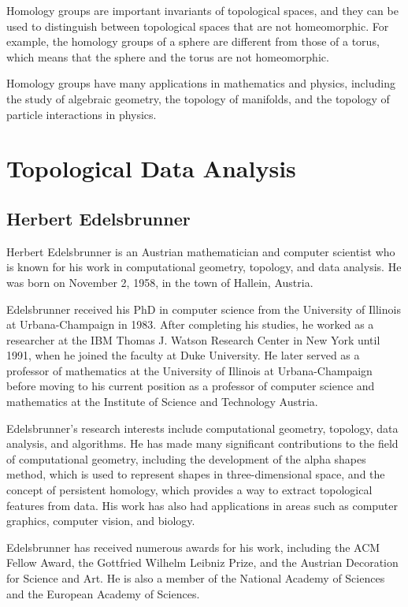 \documentclass{IEEEcsmag}
\begin{document}
        Homology groups are important invariants of topological spaces, and they can be used to distinguish 
        between topological spaces that are not homeomorphic. For example, the homology groups of a sphere are 
        different from those of a torus, which means that the sphere and the torus are not homeomorphic.

        Homology groups have many applications in mathematics and physics, including the study of algebraic 
        geometry, the topology of manifolds, and the topology of particle interactions in physics.

\section{Topological Data Analysis}
  \subsection{Herbert Edelsbrunner}
    Herbert Edelsbrunner is an Austrian mathematician and computer scientist who is known for his work in 
    computational geometry, topology, and data analysis. He was born on November 2, 1958, in the town of 
    Hallein, Austria.

    Edelsbrunner received his PhD in computer science from the University of Illinois at Urbana-Champaign in 
    1983. After completing his studies, he worked as a researcher at the IBM Thomas J. Watson Research Center in 
    New York until 1991, when he joined the faculty at Duke University. He later served as a professor of 
    mathematics at the University of Illinois at Urbana-Champaign before moving to his current position as a 
    professor of computer science and mathematics at the Institute of Science and Technology Austria.

    Edelsbrunner's research interests include computational geometry, topology, data analysis, and algorithms. 
    He has made many significant contributions to the field of computational geometry, including the development 
    of the alpha shapes method, which is used to represent shapes in three-dimensional space, and the concept of 
    persistent homology, which provides a way to extract topological features from data. His work has also had 
    applications in areas such as computer graphics, computer vision, and biology.

    Edelsbrunner has received numerous awards for his work, including the ACM Fellow Award, the Gottfried 
    Wilhelm Leibniz Prize, and the Austrian Decoration for Science and Art. He is also a member of the National 
    Academy of Sciences and the European Academy of Sciences.
\end{document}
